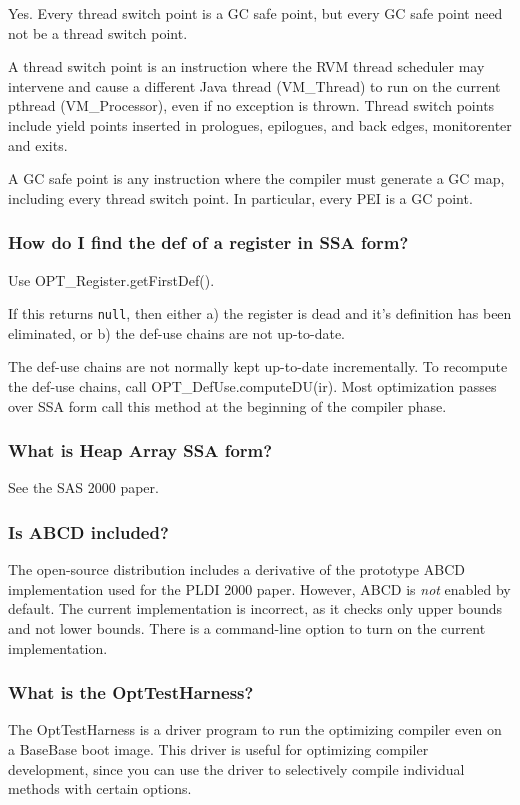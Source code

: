 Yes.  Every thread switch point is a GC safe point, but every GC safe point 
need not be a thread switch point.

A thread switch point is an instruction where the RVM thread scheduler may
intervene and cause a different Java thread (VM\_Thread) to run on the current
pthread (VM\_Processor), even if no exception is thrown.  
Thread switch points include yield points inserted in prologues, epilogues, 
and back edges, monitorenter and exits.

A GC safe point is any instruction where the compiler must generate a GC map, 
including every thread switch point.  In particular, every 
PEI is a GC point.

\subsubsection{How do I find the def of a register in SSA form?}

Use OPT\_Register.getFirstDef().

If this returns {\tt null}, then either a) the register is dead and it's definition has been eliminated, or b) the def-use chains are not up-to-date.

The def-use chains are not normally kept up-to-date incrementally.  To
recompute the def-use chains, call OPT\_DefUse.computeDU(ir). 
Most optimization passes over SSA form call this method at 
the beginning of the compiler phase.

\subsubsection{What is Heap Array SSA form?}

See the SAS 2000 paper. 

\subsubsection{Is ABCD included?}

The open-source distribution includes a derivative of the prototype ABCD 
implementation used for the PLDI 2000 paper.
However, ABCD is {\em not} enabled by default.  The current implementation
is incorrect, as it checks only upper bounds and not lower bounds.
There is a command-line option to turn on the current implementation.

\subsubsection{What is the OptTestHarness?}

The OptTestHarness is a driver program to run the optimizing compiler even
on a BaseBase boot image.  This driver is useful for optimizing compiler
development, since you can use the driver to selectively compile
individual methods with certain options. 
